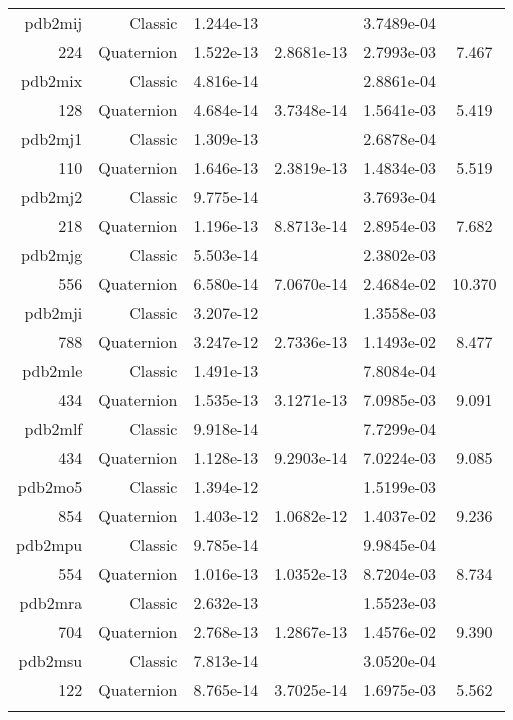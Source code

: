\begin{xltabular}{\textwidth}{r|rS[table-format=1.3e+2]S[table-format=1.4e+2]S[table-format=1.4e+2]S[table-format=-1.3]}
pdb2mij & Classic & 1.244e-13 &  & 3.7489e-04 & \\
224 & Quaternion & 1.522e-13 & 2.8681e-13 & 2.7993e-03 & 7.467\\  \addlinespace
pdb2mix & Classic & 4.816e-14 &  & 2.8861e-04 & \\
128 & Quaternion & 4.684e-14 & 3.7348e-14 & 1.5641e-03 & 5.419\\  \addlinespace
pdb2mj1 & Classic & 1.309e-13 &  & 2.6878e-04 & \\
110 & Quaternion & 1.646e-13 & 2.3819e-13 & 1.4834e-03 & 5.519\\  \addlinespace
pdb2mj2 & Classic & 9.775e-14 &  & 3.7693e-04 & \\
218 & Quaternion & 1.196e-13 & 8.8713e-14 & 2.8954e-03 & 7.682\\  \addlinespace
pdb2mjg & Classic & 5.503e-14 &  & 2.3802e-03 & \\
556 & Quaternion & 6.580e-14 & 7.0670e-14 & 2.4684e-02 & 10.370\\  \addlinespace
pdb2mji & Classic & 3.207e-12 &  & 1.3558e-03 & \\
788 & Quaternion & 3.247e-12 & 2.7336e-13 & 1.1493e-02 & 8.477\\  \addlinespace
pdb2mle & Classic & 1.491e-13 &  & 7.8084e-04 & \\
434 & Quaternion & 1.535e-13 & 3.1271e-13 & 7.0985e-03 & 9.091\\  \addlinespace
pdb2mlf & Classic & 9.918e-14 &  & 7.7299e-04 & \\
434 & Quaternion & 1.128e-13 & 9.2903e-14 & 7.0224e-03 & 9.085\\  \addlinespace
pdb2mo5 & Classic & 1.394e-12 &  & 1.5199e-03 & \\
854 & Quaternion & 1.403e-12 & 1.0682e-12 & 1.4037e-02 & 9.236\\  \addlinespace
pdb2mpu & Classic & 9.785e-14 &  & 9.9845e-04 & \\
554 & Quaternion & 1.016e-13 & 1.0352e-13 & 8.7204e-03 & 8.734\\  \addlinespace
pdb2mra & Classic & 2.632e-13 &  & 1.5523e-03 & \\
704 & Quaternion & 2.768e-13 & 1.2867e-13 & 1.4576e-02 & 9.390\\  \addlinespace
pdb2msu & Classic & 7.813e-14 &  & 3.0520e-04 & \\
122 & Quaternion & 8.765e-14 & 3.7025e-14 & 1.6975e-03 & 5.562\\  \addlinespace

\end{xltabular}
